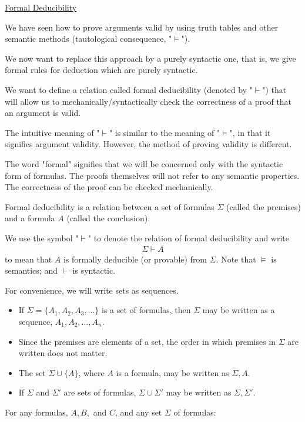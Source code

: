 \documentclass{article}
\begin{document}
\underline{Formal Deducibility}

We have seen how to prove arguments valid by using truth tables and other semantic methods (tautological consequence, "$\vDash$").

We now want to replace this approach by a purely syntactic one, that is, we give formal rules for deduction which are purely syntactic.

We want to define a relation called formal deducibility (denoted by "$\vdash$") that will allow us to mechanically/syntactically check the correctness of a proof that an argument is valid.

The intuitive meaning of "$\vdash$" is similar to the meaning of "$\vDash$", in that it signifies argument validity. However, the method of proving validity is different. 

The word "formal" signifies that we will be concerned only with the syntactic form of formulas. The proofs themselves will not refer to any semantic properties. The correctness of the proof can be checked mechanically. 

Formal deducibility is a relation between a set of formulas $\Sigma$ (called the premises) and a formula $A$ (called the conclusion).

We use the symbol "$\vdash$" to denote the relation of formal deducibility and write
\begin{align*}
\Sigma \vdash A
\end{align*}
to mean that $A$ is formally deducible (or provable) from $\Sigma$. Note that $\vDash$ is semantics; and $\vdash$ is syntactic.

For convenience, we will write sets as sequences.
\begin{itemize}
    \item If $\Sigma = \{A_1, A_2, A_3, \ldots\}$ is a set of formulas, then $\Sigma$ may be written as a sequence, $A_1, A_2, \ldots, A_n$.
    \item Since the premises are elements of a set, the order in which premises in $\Sigma$ are written does not matter.
    \item The set $\Sigma \cup \{A\}$, where $A$ is a formula, may be written as $\Sigma, A$.
    \item If $\Sigma$ and $\Sigma'$ are sets of formulas, $\Sigma \cup \Sigma'$ may be written as $\Sigma, \Sigma'$.
\end{itemize}

For any formulas, $A, B,$ and $C$, and any set $\Sigma$ of formulas:
\end{document}
